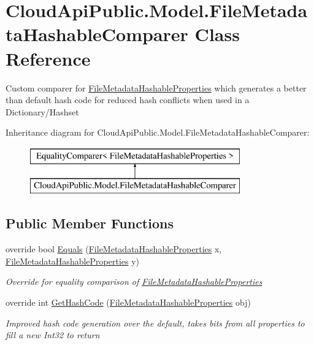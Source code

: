 \hypertarget{class_cloud_api_public_1_1_model_1_1_file_metadata_hashable_comparer}{\section{Cloud\-Api\-Public.\-Model.\-File\-Metadata\-Hashable\-Comparer Class Reference}
\label{class_cloud_api_public_1_1_model_1_1_file_metadata_hashable_comparer}
}


Custom comparer for \hyperlink{struct_cloud_api_public_1_1_model_1_1_file_metadata_hashable_properties}{File\-Metadata\-Hashable\-Properties} which generates a better than default hash code for reduced hash conflicts when used in a Dictionary/\-Hashset  


Inheritance diagram for Cloud\-Api\-Public.\-Model.\-File\-Metadata\-Hashable\-Comparer\-:\begin{figure}[H]
\begin{center}
\leavevmode
\includegraphics[height=2.000000cm]{class_cloud_api_public_1_1_model_1_1_file_metadata_hashable_comparer}
\end{center}
\end{figure}
\subsection*{Public Member Functions}
\begin{DoxyCompactItemize}
\item 
override bool \hyperlink{class_cloud_api_public_1_1_model_1_1_file_metadata_hashable_comparer_a1363a52da7f8af3813342935303da7a5}{Equals} (\hyperlink{struct_cloud_api_public_1_1_model_1_1_file_metadata_hashable_properties}{File\-Metadata\-Hashable\-Properties} x, \hyperlink{struct_cloud_api_public_1_1_model_1_1_file_metadata_hashable_properties}{File\-Metadata\-Hashable\-Properties} y)
\begin{DoxyCompactList}\small\item\em Override for equality comparison of \hyperlink{struct_cloud_api_public_1_1_model_1_1_file_metadata_hashable_properties}{File\-Metadata\-Hashable\-Properties} \end{DoxyCompactList}\item 
override int \hyperlink{class_cloud_api_public_1_1_model_1_1_file_metadata_hashable_comparer_a950a8623aae44761bcf4814b6edfacf7}{Get\-Hash\-Code} (\hyperlink{struct_cloud_api_public_1_1_model_1_1_file_metadata_hashable_properties}{File\-Metadata\-Hashable\-Properties} obj)
\begin{DoxyCompactList}\small\item\em Improved hash code generation over the default, takes bits from all properties to fill a new Int32 to return \end{DoxyCompactList}\end{DoxyCompactItemize}


